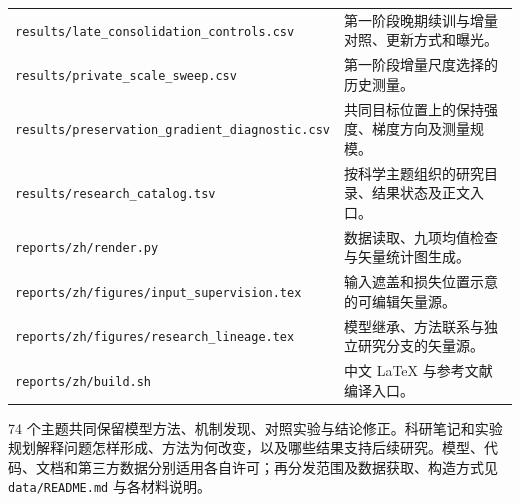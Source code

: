 \begin{longtable}{@{}P{69mm}P{81mm}@{}}
\nolinkurl{results/late_consolidation_controls.csv} & 第一阶段晚期续训与增量对照、更新方式和曝光。\\
\nolinkurl{results/private_scale_sweep.csv} & 第一阶段增量尺度选择的历史测量。\\
\nolinkurl{results/preservation_gradient_diagnostic.csv} & 共同目标位置上的保持强度、梯度方向及测量规模。\\
\nolinkurl{results/research_catalog.tsv} & 按科学主题组织的研究目录、结果状态及正文入口。\\
\nolinkurl{reports/zh/render.py} & 数据读取、九项均值检查与矢量统计图生成。\\
\nolinkurl{reports/zh/figures/input_supervision.tex} & 输入遮盖和损失位置示意的可编辑矢量源。\\
\nolinkurl{reports/zh/figures/research_lineage.tex} & 模型继承、方法联系与独立研究分支的矢量源。\\
\nolinkurl{reports/zh/build.sh} & 中文 LaTeX 与参考文献编译入口。\\
\end{longtable}

74 个主题共同保留模型方法、机制发现、对照实验与结论修正。科研笔记和实验规划解释问题怎样形成、方法为何改变，以及哪些结果支持后续研究。模型、代码、文档和第三方数据分别适用各自许可；再分发范围及数据获取、构造方式见 \nolinkurl{data/README.md} 与各材料说明。
